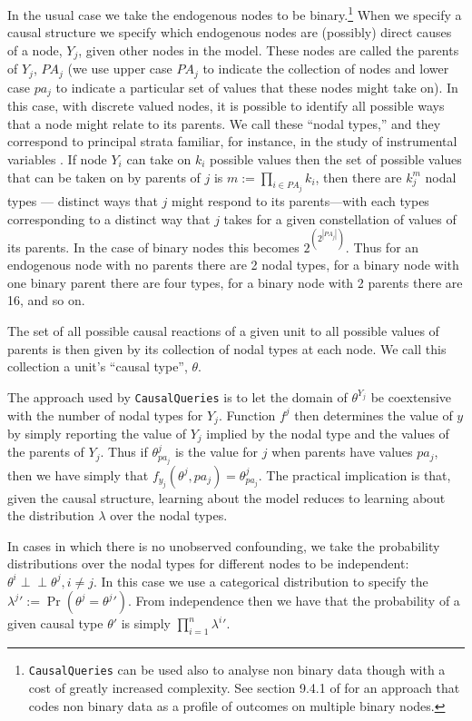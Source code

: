 \documentclass[
  article]{jss}
\begin{document}
In the usual case we take the endogenous nodes to be binary.\footnote{\texttt{CausalQueries}
  can be used also to analyse non binary data though with a cost of
  greatly increased complexity. See section 9.4.1 of \citet{ii2023} for
  an approach that codes non binary data as a profile of outcomes on
  multiple binary nodes.} When we specify a causal structure we specify
which endogenous nodes are (possibly) direct causes of a node, \(Y_j\),
given other nodes in the model. These nodes are called the parents of
\(Y_j\), \(PA_j\) (we use upper case \(PA_j\) to indicate the collection
of nodes and lower case \(pa_j\) to indicate a particular set of values
that these nodes might take on). In this case, with discrete valued
nodes, it is possible to identify all possible ways that a node might
relate to its parents. We call these ``nodal types,'' and they
correspond to principal strata familiar, for instance, in the study of
instrumental variables \citep{frangakis2002principal}. If node \(Y_i\)
can take on \(k_i\) possible values then the set of possible values that
can be taken on by parents of \(j\) is \(m :=\prod_{i\in PA_j}k_i\),
then there are \(k_j^{m}\) nodal types --- distinct ways that \(j\)
might respond to its parents---with each types corresponding to a
distinct way that \(j\) takes for a given constellation of values of its
parents. In the case of binary nodes this becomes
\(2^{\left(2^{|PA_j|}\right)}\). Thus for an endogenous node with no
parents there are 2 nodal types, for a binary node with one binary
parent there are four types, for a binary node with 2 parents there are
16, and so on.

The set of all possible causal reactions of a given unit to all possible
values of parents is then given by its collection of nodal types at each
node. We call this collection a unit's ``causal type'', \(\theta\).

The approach used by \texttt{CausalQueries} is to let the domain of
\(\theta^{Y_j}\) be coextensive with the number of nodal types for
\(Y_j\). Function \(f^j\) then determines the value of \(y\) by simply
reporting the value of \(Y_j\) implied by the nodal type and the values
of the parents of \(Y_j\). Thus if \(\theta^j_{pa_j}\) is the value for
\(j\) when parents have values \(pa_j\), then we have simply that
\(f_{y_j}(\theta^{j}, pa_j) = \theta^j_{pa_j}\). The practical
implication is that, given the causal structure, learning about the
model reduces to learning about the distribution \(\lambda\) over the
nodal types.

In cases in which there is no unobserved confounding, we take the
probability distributions over the nodal types for different nodes to be
independent: \(\theta^i \perp\!\!\! \perp \theta^j, i\neq j\). In this
case we use a categorical distribution to specify the
\({\lambda^j}' := \Pr(\theta^j = {\theta^j}')\). From independence then
we have that the probability of a given causal type \(\theta'\) is
simply \(\prod_{i=1}^n {\lambda^i}'\).
\end{document}
